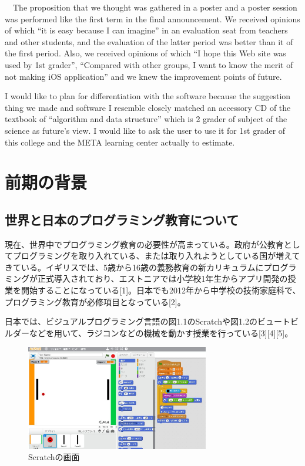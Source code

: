 \documentclass[openany,11pt,papersize]{jsbook}
\begin{document}
\begin{eabstract}
　The proposition that we thought was gathered in a poster and a poster session was performed like the first term in the final announcement. We received opinions of which ``it is easy because I can imagine'' in an evaluation seat from teachers and other students, and the evaluation of the latter period was better than it of the first period. Also, we received opinions of which ``I hope this Web site was used by 1st grader'', ``Compared with other groups, I want to know the merit of not making iOS application'' and we knew the improvement points of future.

I would like to plan for differentiation with the software because the suggestion thing we made and software I resemble closely matched an accessory CD of the textbook of ``algorithm and data structure'' which is 2 grader of subject of the science as future's view. I would like to ask the user to use it for 1st grader of this college and the META learning center actually to estimate.
\end{eabstract}

\tableofcontents%


\mainmatter%

\chapter{前期の背景}
\section{世界と日本のプログラミング教育について}
現在、世界中でプログラミング教育の必要性が高まっている。政府が公教育としてプログラミングを取り入れている、または取り入れようとしている国が増えてきている。イギリスでは、5歳から16歳の義務教育の新カリキュラムにプログラミングが正式導入されており、エストニアでは小学校1年生からアプリ開発の授業を開始することになっている[1]。日本でも2012年から中学校の技術家庭科で、プログラミング教育が必修項目となっている[2]。

日本では、ビジュアルプログラミング言語の図1.1のScratchや図1.2のビュートビルダーなどを用いて、ラジコンなどの機械を動かす授業を行っている[3][4][5]。
\begin{figure}[H]
\begin{center}
\includegraphics[width=8cm, bb=0 0 1306 780]{img/Scratch.jpg}
\end{center}
\caption{Scratchの画面}
\end{figure}
\end{document}
